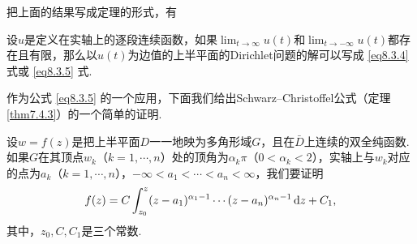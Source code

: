 把上面的结果写成定理的形式，有
\begin{theorem}\label{thm8.3.1}
设$u$是定义在实轴上的逐段连续函数，如果$\lim_{t\to\infty}u(t)$和$\lim_{t\to-\infty}u(t)$都存在且有限，那么以$u(t)$为边值的上半平面的Dirichlet问题的解可以写成 \eqref{eq8.3.4} 式或 \eqref{eq8.3.5} 式.
\end{theorem}

作为公式 \eqref{eq8.3.5} 的一个应用，下面我们给出Schwarz--Christoffel公式（定理 \ref{thm7.4.3}）的一个简单的证明.

设$w=f(z)$是把上半平面$D$一一地映为多角形域$G$，且在$\bar D$上连续的双全纯函数.如果$G$在其顶点$w_k$（$k=1,\cdots,n$）处的顶角为$\alpha_k\pi$（$0<\alpha_k<2$），实轴上与$w_k$对应的点为$a_k$（$k=1,\cdots,n$），$-\infty<a_1<\cdots<a_n<\infty$，我们要证明
\begin{equation}\label{eq8.3.6}
f(z)=C\int_{z_0}^z(z-a_1)^{\alpha_1-1}\cdots(z-a_n)^{\alpha_n-1}\mathop{}\!\mathrm dz+C_1,
\end{equation}
其中，$z_0,C,C_1$是三个常数.


